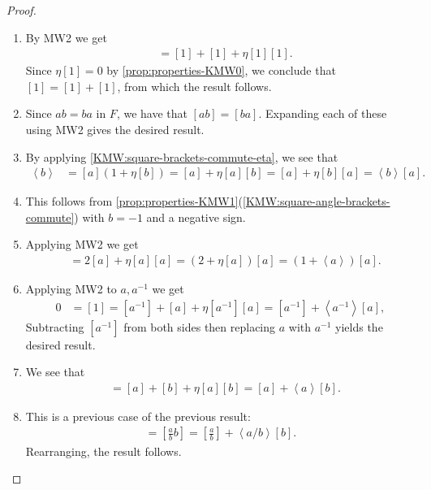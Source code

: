 \documentclass[11pt,openany]{book}
\begin{document}
\begin{proof} $\ $
\begin{enumerate}
    \item By MW2 we get
    \begin{align*}
        [1\cdot 1] &= [1] + [1] + \eta[1][1].
    \end{align*}
    Since $\eta[1] = 0$ by \autoref{prop:properties-KMW0}, we conclude that $[1] = [1] + [1]$, from which the result follows.
    
    \item Since $ab=ba$ in $F$, we have that $[ab] = [ba]$. Expanding each of these using MW2 gives the desired result.

    \item By applying \autoref{KMW:square-brackets-commute-eta}, we see that
    \begin{align*}
        [a] \left\langle b \right\rangle &= [a] \left( 1 + \eta[b] \right) = [a] + \eta[a][b] = [a] + \eta[b][a] = \left\langle b \right\rangle[a].
    \end{align*}

    \item This follows from \autoref{prop:properties-KMW1}(\ref{KMW:square-angle-brackets-commute}) with $b=-1$ and a negative sign.
    

    \item Applying MW2 we get
    \begin{align*}
        [a^2] &= 2[a] + \eta[a][a] = (2+\eta[a])[a] = (1 + \left\langle a \right\rangle)[a].
    \end{align*}
    \item Applying MW2 to $a,a^{-1}$ we get
    \begin{align*}
        0 &=  [1] = [a^{-1}] + [a] + \eta[a^{-1}][a] = [a^{-1}] + \left\langle a^{-1} \right\rangle[a],
    \end{align*}
    Subtracting $[a^{-1}]$ from both sides then replacing $a$ with $a^{-1}$ yields the desired result.
    

    \item We see that
    \begin{align*}
        [ab] &= [a] + [b] + \eta[a][b] = [a] + \left\langle a \right\rangle[b].
    \end{align*}
    
    \item This is a previous case of the previous result:
    \begin{align*}
        [a] = \left[ \frac{a}{b}b \right] = \left[ \frac{a}{b} \right] + \left\langle a/b \right\rangle [b].
    \end{align*}
    Rearranging, the result follows.
\end{enumerate}
\end{proof}
\end{document}
